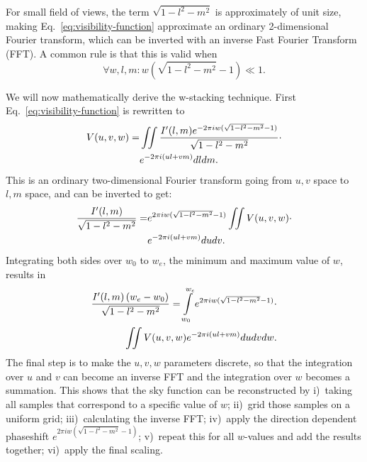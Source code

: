 \documentclass[useAMS,usenatbib]{mn2e}
\begin{document}
For small field of views, the term $\sqrt{1-l^2-m^2}$ is approximately of unit size, making Eq.~\eqref{eq:visibility-function} approximate an ordinary 2-dimensional Fourier transform, which can be inverted with an inverse Fast Fourier Transform (FFT). A common rule is that this is valid when
\begin{equation}\label{eq:when-2d-is-valid}
\forall w,l,m: w\left(\sqrt{1-l^2-m^2}-1\right) \ll 1.
\end{equation}

We will now mathematically derive the w-stacking technique. First Eq.~\eqref{eq:visibility-function} is rewritten to
\begin{align}\notag
V(u,v,w) = & \iint \frac{I'(l,m) e^{-2\pi i w(\sqrt{1-l^2-m^2}-1)}}{\sqrt{1-l^2-m^2}} \cdot \\ \notag
& e^{-2\pi i \left(ul + vm\right)} dl dm.
\end{align}
This is an ordinary two-dimensional Fourier transform going from $u,v$ space to $l,m$ space, and can be inverted to get:
\begin{align}\notag
\frac{I'(l,m)}{\sqrt{1-l^2-m^2}} = & e^{2\pi i w(\sqrt{1-l^2-m^2}-1)} \iint V(u,v,w) \cdot \\ \notag
& e^{-2\pi i \left(ul + vm\right)} du dv.
\end{align}
Integrating both sides over $w_0$ to $w_e$, the minimum and maximum value of $w$, results in
\begin{align}\notag
\frac{I'(l,m)\left(w_e - w_0\right)}{\sqrt{1-l^2-m^2}} = \int\limits_{w_0}^{w_e} e^{2\pi i w(\sqrt{1-l^2-m^2}-1)} \cdot \\ \label{eq:wstacking}
\iint V(u,v,w)  e^{-2\pi i \left(ul + vm\right)} du dv dw.
\end{align}
The final step is to make the $u,v,w$ parameters discrete, so that the integration over $u$ and $v$ can become an inverse FFT and the integration over $w$ becomes a summation. This shows that the sky function can be reconstructed by i)~taking all samples that correspond to a specific value of $w$; ii)~grid those samples on a uniform grid; iii)~calculating the inverse FFT; iv)~apply the direction dependent phaseshift $e^{2\pi i w(\sqrt{1-l^2-m^2}-1)}$; v)~repeat this for all $w$-values and add the results together; vi)~apply the final scaling.
\end{document}
